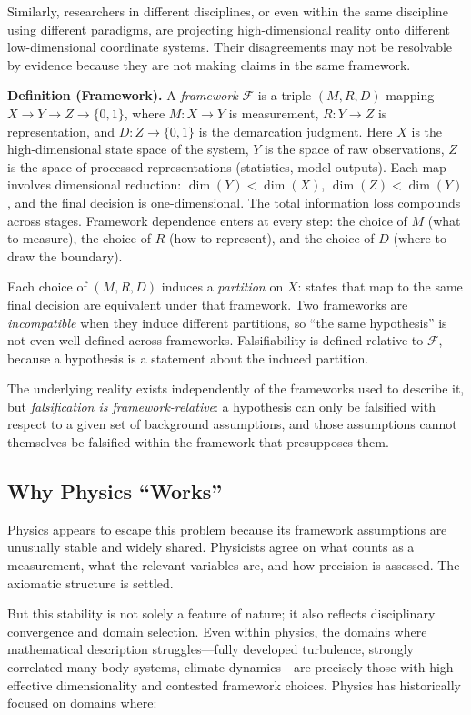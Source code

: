 \documentclass[12pt]{article}
\begin{document}
Similarly, researchers in different disciplines, or even within the same discipline using different paradigms, are projecting high-dimensional reality onto different low-dimensional coordinate systems. Their disagreements may not be resolvable by evidence because they are not making claims in the same framework.

\textbf{Definition (Framework).} A \emph{framework} $\mathcal{F}$ is a triple $(M,R,D)$ mapping $X \to Y \to Z \to \{0,1\}$, where $M: X \to Y$ is measurement, $R: Y \to Z$ is representation, and $D: Z \to \{0,1\}$ is the demarcation judgment. Here $X$ is the high-dimensional state space of the system, $Y$ is the space of raw observations, $Z$ is the space of processed representations (statistics, model outputs). Each map involves dimensional reduction: $\dim(Y) < \dim(X)$, $\dim(Z) < \dim(Y)$, and the final decision is one-dimensional. The total information loss compounds across stages. Framework dependence enters at every step: the choice of $M$ (what to measure), the choice of $R$ (how to represent), and the choice of $D$ (where to draw the boundary).

Each choice of $(M,R,D)$ induces a \emph{partition} on $X$: states that map to the same final decision are equivalent under that framework. Two frameworks are \emph{incompatible} when they induce different partitions, so ``the same hypothesis'' is not even well-defined across frameworks. Falsifiability is defined relative to $\mathcal{F}$, because a hypothesis is a statement about the induced partition.

The underlying reality exists independently of the frameworks used to describe it, but \emph{falsification is framework-relative}: a hypothesis can only be falsified with respect to a given set of background assumptions, and those assumptions cannot themselves be falsified within the framework that presupposes them.

\subsection{Why Physics ``Works''}

Physics appears to escape this problem because its framework assumptions are unusually stable and widely shared. Physicists agree on what counts as a measurement, what the relevant variables are, and how precision is assessed. The axiomatic structure is settled.

But this stability is not solely a feature of nature; it also reflects disciplinary convergence and domain selection. Even within physics, the domains where mathematical description struggles---fully developed turbulence, strongly correlated many-body systems, climate dynamics---are precisely those with high effective dimensionality and contested framework choices. Physics has historically focused on domains where:
\end{document}
